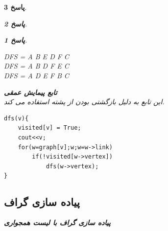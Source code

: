 \documentclass[12pt]{article}
\newtheorem{answer}{پاسخ}[section]
\begin{document}
\begin{answer}
\begin{answer}
\begin{answer}
\begin{latin}
\begin{center}
\begin{minipage}{0.5\textwidth}
\end{minipage}%
\begin{minipage}{0.5\textwidth}
DFS = A B E D F C\\
DFS = A B D F E C\\
DFS = A D E F B C \\
\end{minipage}
\end{center}
\end{latin}
\end{answer}
\textbf{تابع پیمایش عمقی }\\
این تابع به دلیل بازگشتی بودن از پشته استفاده می کند.
\begin{flushright}
\begin{latin}
\begin{lstlisting}
dfs(v){
	visited[v] = True;
	cout<<v;
	for(w=graph[v];w;w=w->link)
		if(!visited[w->vertex])
			dfs(w->vertex);
}
\end{lstlisting}
\end{latin}
\end{flushright}
\newpage
\subsection{پیاده سازی گراف}

\textbf{پیاده سازی گراف با لیست  همجواری}\\


\end{answer}
\end{answer}
\end{document}
